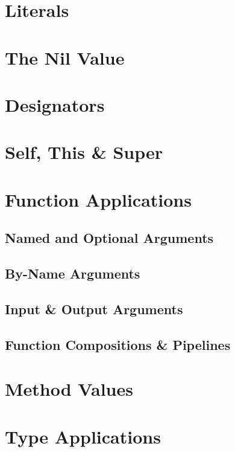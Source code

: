 \section{Literals}

\section{The Nil Value}

\section{Designators}

\section{Self, This \& Super}

\section{Function Applications}
\label{sec:function-applications}

\subsection{Named and Optional Arguments}
\label{sec:named-optional-arguments}

\subsection{By-Name Arguments}
\label{sec:by-name-arguments}

\subsection{Input \& Output Arguments}
\label{sec:io-arguments}

\subsection{Function Compositions \& Pipelines}

\section{Method Values}

\section{Type Applications}

